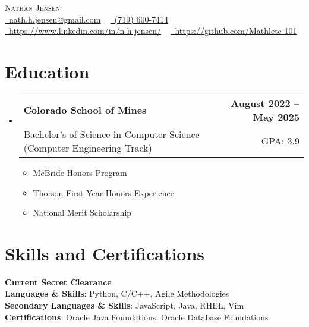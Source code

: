 \documentclass[11pt, letterpaper]{article}
\makeatletter
\newcommand{\resumeItem}[1]{
  \item\small{
    {#1 \vspace{-2pt}}
  }
}
\newcommand{\resumeSubheading}[4]{
  \vspace{-2pt}\item
    \begin{tabular*}{1.0\textwidth}[t]{l@{\extracolsep{\fill}}r}
      \textbf{#1} & \textbf{\small #2} \\
      {\small#3} & {\small #4} \\
    \end{tabular*}\vspace{-7pt}
}
\newcommand{\resumeSubHeadingListStart}{\begin{itemize}[leftmargin=0.0in, label={}]}
\newcommand{\resumeSubHeadingListEnd}{\end{itemize}}
\newcommand{\resumeItemListStart}{\begin{itemize}}
\newcommand{\resumeItemListEnd}{\end{itemize}\vspace{-5pt}}
\makeatother
\begin{document}
\begin{center}
    {
    \huge \scshape Nathan Jensen} \\ \vspace{4pt}
    \small
    \href{mailto:nath.h.jensen@gmail.com}{\faEnvelope\ nath.h.jensen@gmail.com} ~
    \href{tel:7196007414}{\faPhone\ (719) 600-7414} ~ \\
    \vspace{2pt}
    \href{https://www.linkedin.com/in/n-h-jensen/}{\faLinkedin\ https://www.linkedin.com/in/n-h-jensen/}  ~
    \href{https://github.com/Mathlete-101}{\faGithub\ https://github.com/Mathlete-101}
    \vspace{-5pt}
\end{center}



\section{Education}   %
  \resumeSubHeadingListStart
    \resumeSubheading
      {Colorado School of Mines}{August 2022 -- May 2025}
      {Bachelor's of Science in Computer Science (Computer Engineering Track)}{GPA: 3.9}
      \resumeItemListStart
        \resumeItem{McBride Honors Program}
        \resumeItem{Thorson First Year Honors Experience}
        \resumeItem{National Merit Scholarship}
    \resumeItemListEnd
    \resumeSubHeadingListEnd

\section{Skills and Certifications}   %
 \begin{itemize}[leftmargin=0.1in, label={}]
    \small{\item{
      \textbf{Current Secret Clearance}\\
      \textbf{Languages \& Skills}{: Python, C/C++, Agile Methodologies} \\
      \textbf{Secondary Languages \& Skills}{: JavaScript, Java, RHEL, Vim}\\
      \textbf{Certifications}{: Oracle Java Foundations, Oracle Database Foundations}\\
    }}
 \end{itemize}
\end{document}
